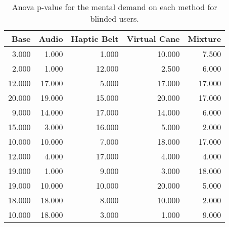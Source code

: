 
\begin{table}[!htb]
\centering
\caption{Anova p-value for the mental demand on each method for blinded users.}
\label{tab:anova_mental_demand}
\begin{tabular}{rrrrr}
\toprule
  Base &  Audio &  Haptic Belt &  Virtual Cane &  Mixture \\
\midrule
 3.000 &  1.000 &        1.000 &        10.000 &    7.500 \\
 2.000 &  1.000 &       12.000 &         2.500 &    6.000 \\
12.000 & 17.000 &        5.000 &        17.000 &   17.000 \\
20.000 & 19.000 &       15.000 &        20.000 &   17.000 \\
 9.000 & 14.000 &       17.000 &        14.000 &    6.000 \\
15.000 &  3.000 &       16.000 &         5.000 &    2.000 \\
10.000 & 10.000 &        7.000 &        18.000 &   17.000 \\
12.000 &  4.000 &       17.000 &         4.000 &    4.000 \\
19.000 &  1.000 &        9.000 &         3.000 &   18.000 \\
19.000 & 10.000 &       10.000 &        20.000 &    5.000 \\
18.000 & 18.000 &        8.000 &        10.000 &    2.000 \\
10.000 & 18.000 &        3.000 &         1.000 &    9.000 \\
\bottomrule
\end{tabular}
\end{table}

